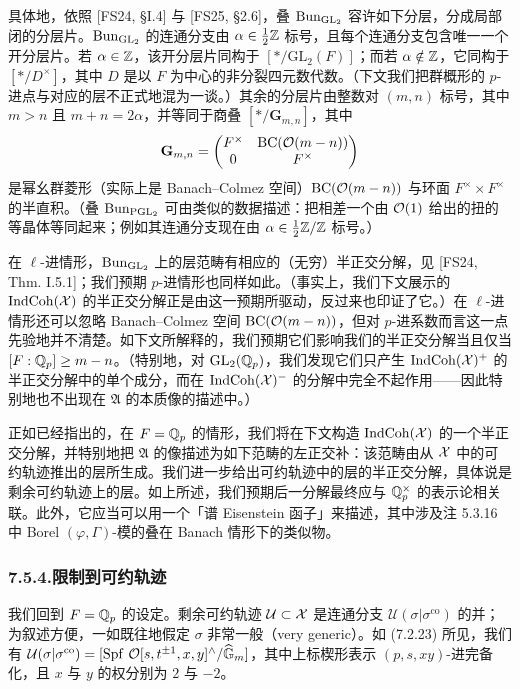 具体地，依照 [FS24, §I.4] 与 [FS25, §2.6]，叠 $\operatorname{Bun}_{\mathrm{GL}_2}$ 容许如下分层，分成局部闭的分层片。$\operatorname{Bun}_{\mathrm{GL}_2}$ 的连通分支由 $\alpha\in\frac{1}{2}\mathbb{Z}$ 标号，且每个连通分支包含唯一一个开分层片。若 $\alpha\in\mathbb{Z}$，该开分层片同构于 $[*/\mathrm{GL}_2(F)]$；而若 $\alpha\notin\mathbb{Z}$，它同构于 $[*/D^\times]$，其中 $D$ 是以 $F$ 为中心的非分裂四元数代数。（下文我们把群概形的 $p$-进点与对应的层不正式地混为一谈。）其余的分层片由整数对 $(m,n)$ 标号，其中 $m>n$ 且 $m+n=2\alpha$，并等同于商叠 $[*/\mathbf G_{m,n}]$，其中
\[
\mathbf G_{m,n}=\begin{pmatrix}F^\times&\mathrm{BC}(\mathcal{O}(m-n))\\0&F^\times\end{pmatrix}
\]
是幂幺群菱形（实际上是 Banach--Colmez 空间）$\mathrm{BC}(\mathcal{O}(m-n))$ 与环面 $F^\times\times F^\times$ 的半直积。（叠 $\operatorname{Bun}_{\mathrm{PGL}_2}$ 可由类似的数据描述：把相差一个由 $\mathcal{O}(1)$ 给出的扭的等晶体等同起来；例如其连通分支现在由 $\alpha\in\frac{1}{2}\mathbb{Z}/\mathbb{Z}$ 标号。）

在 $\ell$-进情形，$\operatorname{Bun}_{\mathrm{GL}_2}$ 上的层范畴有相应的（无穷）半正交分解，见 [FS24, Thm. I.5.1]；我们预期 $p$-进情形也同样如此。（事实上，我们下文展示的 $\operatorname{IndCoh}(\mathcal{X})$ 的半正交分解正是由这一预期所驱动，反过来也印证了它。）在 $\ell$-进情形还可以忽略 Banach--Colmez 空间 $\mathrm{BC}(\mathcal{O}(m-n))$，但对 $p$-进系数而言这一点先验地并不清楚。如下文所解释的，我们预期它们影响我们的半正交分解当且仅当 $[F:\mathbb{Q}_p]\ge m-n$。（特别地，对 $\mathrm{GL}_2(\mathbb{Q}_p)$，我们发现它们只产生 $\operatorname{IndCoh}(\mathcal{X})^{+}$ 的半正交分解中的单个成分，而在 $\operatorname{IndCoh}(\mathcal{X})^{-}$ 的分解中完全不起作用——因此特别地也不出现在 $\mathfrak A$ 的本质像的描述中。）

正如已经指出的，在 $F=\mathbb{Q}_p$ 的情形，我们将在下文构造 $\operatorname{IndCoh}(\mathcal{X})$ 的一个半正交分解，并特别地把 $\mathfrak A$ 的像描述为如下范畴的左正交补：该范畴由从 $\mathcal{X}$ 中的可约轨迹推出的层所生成。我们进一步给出可约轨迹中的层的半正交分解，具体说是剩余可约轨迹上的层。如上所述，我们预期后一分解最终应与 $\mathbb{Q}_p^\times$ 的表示论相关联。此外，它应当可以用一个「谱 Eisenstein 函子」来描述，其中涉及注 5.3.16 中 Borel $(\varphi,\Gamma)$-模的叠在 Banach 情形下的类似物。

\subsubsection*{7.5.4.\quad 限制到可约轨迹}
我们回到 $F=\mathbb{Q}_p$ 的设定。剩余可约轨迹 $\mathcal U\subset\mathcal{X}$ 是连通分支 $\mathcal U(\sigma|\sigma^{\mathrm{co}})$ 的并；为叙述方便，一如既往地假定 $\sigma$ 非常一般（very generic）。如 (7.2.23) 所见，我们有 $\mathcal U(\sigma|\sigma^{\mathrm{co}})=[\operatorname{Spf}\,\mathcal{O}[s,t^{\pm1},x,y]^{\wedge}/\widehat{\mathbb{G}}_m]$，其中上标楔形表示 $(p,s,xy)$-进完备化，且 $x$ 与 $y$ 的权分别为 $2$ 与 $-2$。

